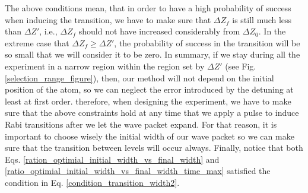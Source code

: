\documentclass{article}
\begin{document}
The above conditions mean, that in order to have a high probability of success when inducing the transition, we have to make sure that $\Delta Z_{f}$ is still much less than $\Delta Z'$, i.e.,  $\Delta Z_{f}$ should not have increased considerably from $\Delta Z_{0}$. In the extreme case that $\Delta Z_{f} \ge \Delta Z'$, the probability of success in the transition will be so small that we will consider it to be zero. 
In summary, if we stay during all the experiment in a narrow region within the region set by $\Delta Z'$ (see Fig. \ref{selection_range_figure}), then, our method will not depend on the initial position of the atom, so we can neglect the error introduced by the detuning at least at first order.
therefore, when designing the experiment, we have to make sure that the above constraints hold at any time that we apply a pulse to induce Rabi transitions after we let the wave packet expand. For that reason, it is important to choose wisely the initial width of our wave packet so we can make sure that the transition between levels will occur always. Finally, notice that both Eqs. \ref{ration_optimial_initial_width_vs_final_width} and 
\ref{ratio_optimial_initial_width_vs_final_width_time_max} satisfied the condition in Eq. \ref{condition_transition_width2}.
\end{document}
